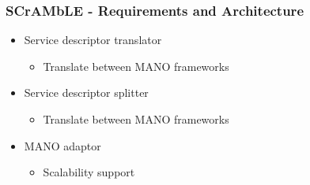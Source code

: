 \begin{frame}
\frametitle{SCrAMbLE - Requirements and Architecture}
\begin{itemize}
	
	\item Service descriptor translator
	\begin{itemize}
		\item Translate between MANO frameworks
	\end{itemize}
	\item Service descriptor splitter
	\begin{itemize}
		\item Translate between MANO frameworks
	\end{itemize}
	
	\item MANO adaptor
	\begin{itemize}
		\item Scalability support
	\end{itemize}
\end{itemize}
\end{frame}
